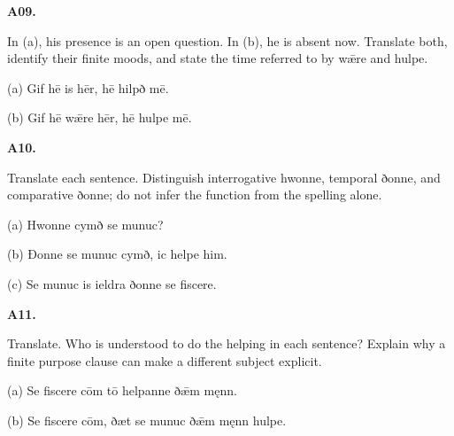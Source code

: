 \par\begin{minipage}{\linewidth}\raggedright
\textbf{A09.}

In (a), his presence is an open question. In (b), he is absent now. Translate both, identify their finite moods, and state the time referred to by wǣre and hulpe.

(a) Gif hē is hēr, hē hilpð mē.

(b) Gif hē wǣre hēr, hē hulpe mē.

\end{minipage}\par\addvspace{4pt}

\par\begin{minipage}{\linewidth}\raggedright
\textbf{A10.}

Translate each sentence. Distinguish interrogative hwonne, temporal ðonne, and comparative ðonne; do not infer the function from the spelling alone.

(a) Hwonne cymð se munuc?

(b) Ðonne se munuc cymð, ic helpe him.

(c) Se munuc is ieldra ðonne se fiscere.

\end{minipage}\par\addvspace{4pt}

\par\begin{minipage}{\linewidth}\raggedright
\textbf{A11.}

Translate. Who is understood to do the helping in each sentence? Explain why a finite purpose clause can make a different subject explicit.

(a) Se fiscere cōm tō helpanne ðǣm męnn.

(b) Se fiscere cōm, ðæt se munuc ðǣm męnn hulpe.

\end{minipage}\par\addvspace{4pt}

